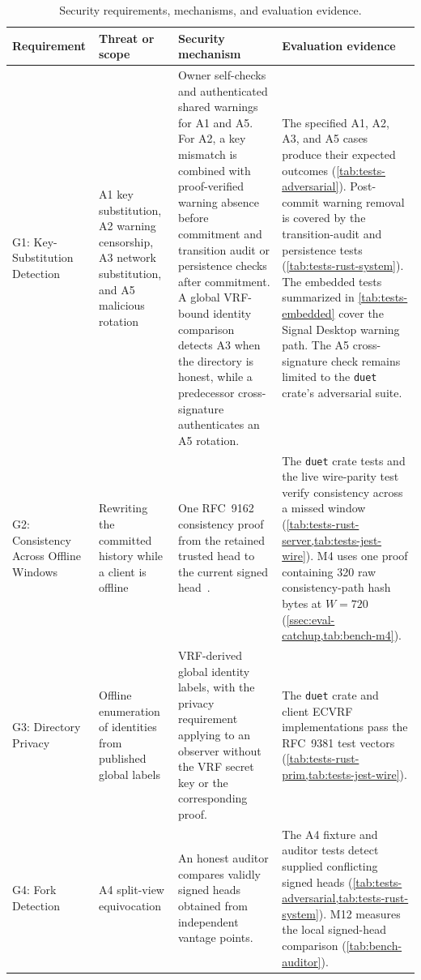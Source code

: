 \begin{table}[htbp]
\centering
\caption{Security requirements, mechanisms, and evaluation evidence.}
\label{tab:eval-security}
\footnotesize
\renewcommand{\arraystretch}{1.25}
\setlength{\extrarowheight}{2pt}
\begin{tabularx}{\textwidth}{@{}
>{\raggedright\arraybackslash}p{2.2cm}
>{\raggedright\arraybackslash}p{2.6cm}
>{\raggedright\arraybackslash}X
>{\raggedright\arraybackslash}X@{}}
\toprule
Requirement & Threat or scope & Security mechanism & Evaluation evidence \\
\midrule

G1: Key-Substitution Detection &
A1 key substitution, A2 warning censorship, A3 network substitution, and A5 malicious rotation &
Owner self-checks and authenticated shared warnings for A1 and A5. For A2, a key mismatch is
combined with proof-verified warning absence before commitment and transition audit or persistence
checks after commitment. A global VRF-bound identity comparison detects A3 when the directory is
honest, while a predecessor cross-signature authenticates an A5 rotation. &
The specified A1, A2, A3, and A5 cases produce their expected outcomes
(\cref{tab:tests-adversarial}). Post-commit warning removal is covered by the transition-audit and
persistence tests (\cref{tab:tests-rust-system}). The embedded tests summarized in
\cref{tab:tests-embedded} cover the Signal Desktop warning path. The A5 cross-signature check
remains limited to the \texttt{duet} crate's adversarial suite. \\

G2: Consistency Across Offline Windows &
Rewriting the committed history while a client is offline &
One RFC~9162 consistency proof from the retained trusted head to the current signed
head~\cite{rfc9162}. &
The \texttt{duet} crate tests and the live wire-parity test verify consistency across a missed window
(\cref{tab:tests-rust-server,tab:tests-jest-wire}). M4 uses one proof containing \num{320} raw
consistency-path hash bytes at $W=720$ (\cref{ssec:eval-catchup,tab:bench-m4}). \\

G3: Directory Privacy &
Offline enumeration of identities from published global labels &
VRF-derived global identity labels, with the privacy requirement applying to an observer without
the VRF secret key or the corresponding proof. &
The \texttt{duet} crate and client ECVRF implementations pass the RFC~9381 test vectors
(\cref{tab:tests-rust-prim,tab:tests-jest-wire}). \\

G4: Fork Detection &
A4 split-view equivocation &
An honest auditor compares validly signed heads obtained from independent vantage points. &
The A4 fixture and auditor tests detect supplied conflicting signed heads
(\cref{tab:tests-adversarial,tab:tests-rust-system}). M12 measures the local signed-head comparison
(\cref{tab:bench-auditor}). \\

\bottomrule
\end{tabularx}
\end{table}

